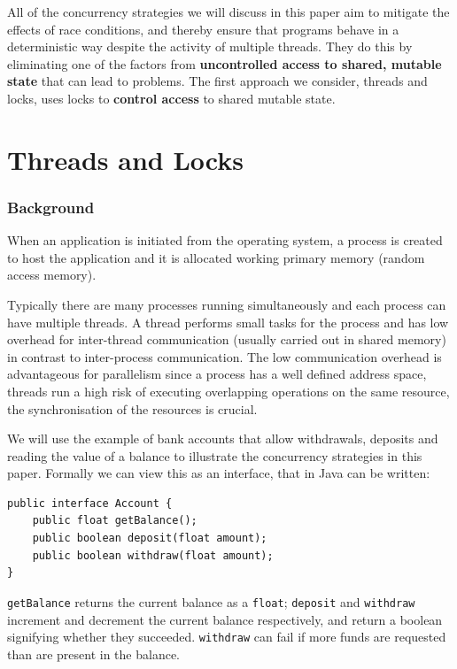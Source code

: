 \documentclass[a4paper,12pt]{kth-mag}
\begin{document}
All of the concurrency strategies we will discuss in this paper aim to mitigate the effects of race conditions, and thereby ensure that programs behave in a deterministic way despite the activity of multiple threads. They do this by eliminating one of the factors from \textbf{uncontrolled access to shared, mutable state} that can lead to problems. The first approach we consider, threads and locks, uses locks to \textbf{control access} to shared mutable state.

\part{Threads and Locks}

\section{Background}
When an application is initiated from the operating system, a process is created to host the application and it is allocated working primary memory (random access memory). 

Typically there are many processes running simultaneously and each process can have multiple threads. A thread performs small tasks for the process and has low overhead for inter-thread communication (usually carried out in shared memory) in contrast to inter-process communication. The low communication overhead is advantageous for parallelism since a process has a well defined address space, threads run a high risk of executing overlapping operations on the same resource, the synchronisation of the resources is crucial.

We will use the example of bank accounts that allow withdrawals, deposits and reading the value of a balance to illustrate the concurrency strategies in this paper. Formally we can view this as an interface, that in Java can be written:

\begin{listing}[H]
	\begin{verbatim}
public interface Account {
    public float getBalance();
    public boolean deposit(float amount);
    public boolean withdraw(float amount);
}
  	\end{verbatim}
\end{listing}

\texttt{getBalance} returns the current balance as a \texttt{float}; \texttt{deposit} and \texttt{withdraw} increment and decrement the current balance respectively, and return a boolean signifying whether they succeeded. \texttt{withdraw} can fail if more funds are requested than are present in the balance.
\end{document}
